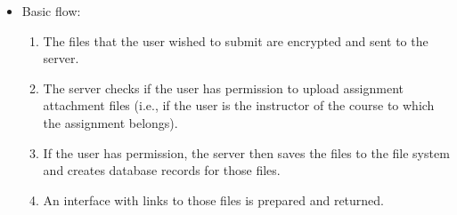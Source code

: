 \begin{enumerate}
\begin{itemize}
\begin{itemize}
        \end{itemize}
    \item Basic flow:
        \begin{enumerate}
            \item The files that the user wished to submit are encrypted and
                sent to the server.
            \item The server checks if the user has permission to upload
                assignment attachment files (i.e., if the user is the
                instructor of the course to which the assignment belongs).
            \item If the user has permission, the server then saves the files to
                the file system and creates database records for those files.
            \item An interface with links to those files is prepared and
                returned.
        \end{enumerate}
\end{itemize}


\end{enumerate}
